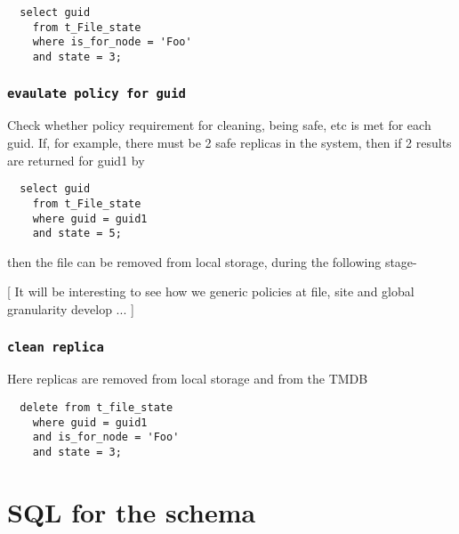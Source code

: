\documentclass{cmspaper}
\begin{document}
{\small\begin{verbatim}
  select guid
  	from t_File_state
  	where is_for_node = 'Foo'
  	and state = 3;
\end{verbatim}}

\subsubsection{\textbf{\texttt{evaulate policy for guid}}}
Check whether policy requirement for cleaning, being safe, etc is met for each guid. If, for example, there must be 2 safe replicas in the system, then if 2 results are returned for guid1 by

{\small\begin{verbatim}
  select guid
  	from t_File_state
  	where guid = guid1
  	and state = 5;
\end{verbatim}}

then the file can be removed from local storage, during the following stage-

[ It will be interesting to see how we generic policies at file, site and global granularity develop ... ]

\subsubsection{\textbf{\texttt{clean replica}}}
Here replicas are removed from local storage and from the TMDB

{\small\begin{verbatim}
  delete from t_file_state
    where guid = guid1
    and is_for_node = 'Foo'
    and state = 3;
\end{verbatim}}

\section{SQL for the schema}
\end{document}
